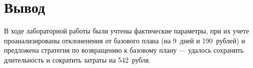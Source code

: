 \section{Вывод}

В ходе лабораторной работы были учтены фактические параметры, при их учете проанализированы отклоненения от базового плана (на 9~дней и 190~рублей) и предложена стратегия по возвращению к базовому плану --- удалось сохранить длительность и сократить затраты на 542~рубля.
